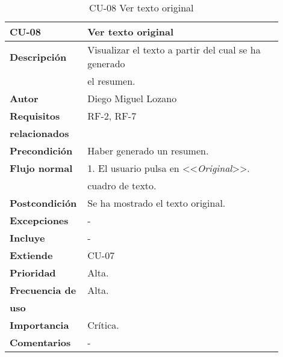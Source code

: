 \begin{longtable}{>{\raggedright}b{0.2\linewidth}>{\raggedright\arraybackslash}b{0.7\linewidth}}
	\toprule
	\textbf{CU-08} & \textbf{Ver texto original} \\
	\toprule
	\endhead
	
	\toprule
	\caption{CU-08 Ver texto original}
	\endfoot
	
	\small{\textbf{Descripción}} & Visualizar el texto a partir del cual se ha generado \\
	& el resumen. \\
	\small{\textbf{Autor}} & Diego Miguel Lozano \\
	\small{\textbf{Requisitos}} & RF-2, RF-7  \\
	\small{\textbf{relacionados}} & \\
	\small{\textbf{Precondición}} & Haber generado un resumen. \\
	\small{\textbf{Flujo normal}} & \quad \small{1. El usuario pulsa en <<\emph{Original}>>. } \\
	& \qquad \small{cuadro de texto.} \\
	\small{\textbf{Postcondición}} & Se ha mostrado el texto original.\\
	\small{\textbf{Excepciones}} & - \\
	\small{\textbf{Incluye}} & - \\
	\small{\textbf{Extiende}} & CU-07 \\
	\small{\textbf{Prioridad}} & Alta. \\
	\small{\textbf{Frecuencia de}} & Alta. \\
	\small{\textbf{uso}} & \\
	\small{\textbf{Importancia}} & Crítica. \\
	\small{\textbf{Comentarios}} & - \\
\end{longtable}


